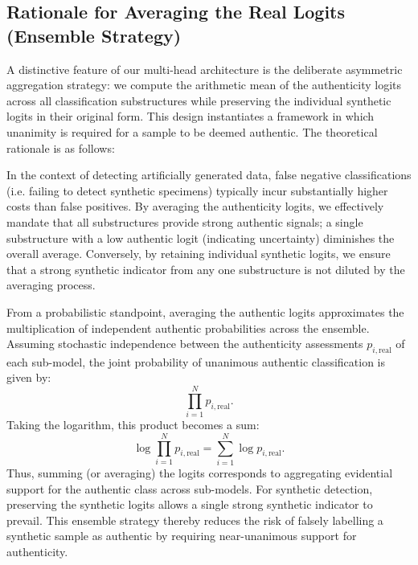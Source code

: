 \documentclass[conference]{IEEEtran}  %
\begin{document}
\subsection{Rationale for Averaging the Real Logits (Ensemble Strategy)}
A distinctive feature of our multi-head architecture is the deliberate asymmetric aggregation strategy: we compute the arithmetic mean of the authenticity logits across all classification substructures while preserving the individual synthetic logits in their original form. This design instantiates a framework in which unanimity is required for a sample to be deemed authentic. The theoretical rationale is as follows:

In the context of detecting artificially generated data, false negative classifications (i.e. failing to detect synthetic specimens) typically incur substantially higher costs than false positives. By averaging the authenticity logits, we effectively mandate that all substructures provide strong authentic signals; a single substructure with a low authentic logit (indicating uncertainty) diminishes the overall average. Conversely, by retaining individual synthetic logits, we ensure that a strong synthetic indicator from any one substructure is not diluted by the averaging process. 

From a probabilistic standpoint, averaging the authentic logits approximates the multiplication of independent authentic probabilities across the ensemble. Assuming stochastic independence between the authenticity assessments \(p_{i,\text{real}}\) of each sub-model, the joint probability of unanimous authentic classification is given by:
\begin{equation}
\label{eq:prod_prob_real}
\prod_{i=1}^N p_{i,\text{real}}.
\end{equation}
Taking the logarithm, this product becomes a sum:
\begin{equation}
\label{eq:log_prod_real}
\log \prod_{i=1}^N p_{i,\text{real}} = \sum_{i=1}^N \log p_{i,\text{real}}.
\end{equation}
Thus, summing (or averaging) the logits corresponds to aggregating evidential support for the authentic class across sub-models. For synthetic detection, preserving the synthetic logits allows a single strong synthetic indicator to prevail. This ensemble strategy thereby reduces the risk of falsely labelling a synthetic sample as authentic by requiring near-unanimous support for authenticity.
\end{document}
